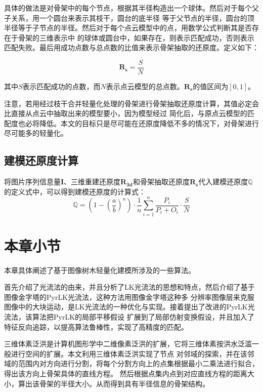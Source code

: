 具体的做法是对骨架中的每个节点，根据其半径构造出一个球体。然后对于每个父子关系，用一个圆台来表示其枝干，圆台的底半径
等于父节点的半径，圆台的顶半径等于子节点的半径。然后对于每个点云模型中的点，用数学公式判断其是否存在于骨架的三维表示中
的球体或圆台中，如果存在，则表示匹配成功，否则表示匹配失败。最后用成功点数与总点数的比值来表示骨架抽取的还原度。定义如下：\\
\begin{definition}
	\[ \mathbf{R_s}=\frac{S}{N} \]
\end{definition}

其中$S$表示匹配成功的点数，而$N$表示点云模型的总点数。$\mathbf{R_s}$的值区间为$[0,1]$。

注意，若用经过枝干合并轻量化处理的骨架进行骨架抽取还原度计算，其值必定会比直接从点云中抽取出来的模型要小，因为模型经过
简化后，与原点云模型的匹配度也必将降低。本文的目标只是尽可能在还原度降低不多的情况下，对骨架进行尽可能多的轻量化。

\subsection{建模还原度计算}
将图片序列信息量$\mathbf{I}$、三维重建还原度$\mathbf{R_{3d}}$和骨架抽取还原度$\mathbf{R_s}$代入建模还原度$\mathbb{Q}$
的定义式中，可以得到建模还原度的计算式：\\
\begin{equation}
	\mathbb{Q}= (1-(\frac{a}{b})^n)\cdot \frac{1}{n}\sum_{i=1}^n \frac{P_i}{P_i+O_i} \cdot \frac{S}{N}
\end{equation}

\clearpage
\section{本章小节}
\label{sec:conclusion}
本章具体阐述了基于图像树木轻量化建模所涉及的一些算法。

首先介绍了光流法的由来，并且分析了LK光流法的思想和特点，然后介绍了基于图像金字塔的PyrLK光流法，这种方法用图像金字塔这种多
分辨率图像层来克服图像中的大块运动，是LK光流法的一种优化与实现。接着提出了改进的PyrLK光流法，该算法把PyrLK的局部平移假设
扩展到了局部仿射变换假设，并且加入了特征反向追踪，以提高算法鲁棒性，实现了高精度的匹配。

三维体素泛洪是计算机图形学中二维像素泛洪的扩展，它将三维体素按洪水泛滥一般进行空间的扩展。本文利用三维体素泛洪实现了节点
对邻域的探索，并在该邻域的范围内对方向进行分割，将每个分割方向上的点集根据最小二乘法进行拟合，得出该方向上骨架具体的直线方程。
然后根据点集内点到对应直线方程的距离大小，算出该骨架的半径大小。从而得到具有半径信息的骨架结构。

